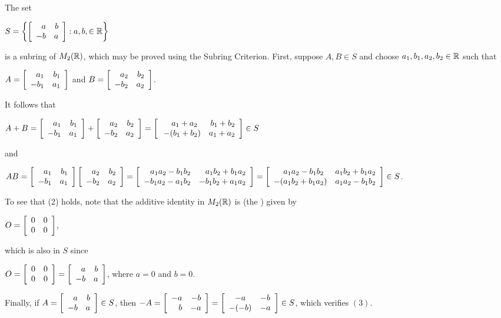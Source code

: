 \documentclass[11pt,fleqn,dvipsnames,usenames]{article}
\newcommand{\p}{\noindent}
\begin{document}
%
\begin{example}\label{abnegativebasubring}
The set
\begin{center}
$S = \SET{\MATRIX{rr}{a & b\\-b & a}:a,b,\in\REAL}$
\end{center}
is a subring of $M_{2}(\REAL)$, which may be proved using the Subring Criterion.  First, suppose $A,B\in S$ and choose $a_{1},b_{1},a_{2},b_{2}\in\REAL$ such that
\begin{center}
$A = \MATRIX{rr}{a_{1} & b_{1}\\-b_{1} & a_{1}}$ and $B = \MATRIX{rr}{a_{2} & b_{2}\\-b_{2} & a_{2}}$.
\end{center}
It follows that
\begin{center}
$A + B = \MATRIX{rr}{a_{1} & b_{1}\\-b_{1} & a_{1}} + \MATRIX{rr}{a_{2} & b_{2}\\-b_{2} & a_{2}} =  \MATRIX{rr}{\phantom{-(}a_{1} + a_{2}\phantom{)}& b_{1} + b_{2}\\-(b_{1} + b_{2}) & a_{1} + a_{2}}\in S$
\end{center}
and
\vsp

\begin{adjustwidth}{-100pt}{-100pt}
\begin{center}
$AB = \MATRIX{rr}{a_{1} & b_{1}\\-b_{1} & a_{1}}\MATRIX{rr}{a_{2} & b_{2}\\-b_{2} & a_{2}} = \MATRIX{cc}{\phantom{-}a_1a_2 - b_1b_2 & \phantom{-}a_1b_2 + b_1a_2\\-b_1a_2-a_1b_2 & -b_1b_2 + a_1a_2} = \MATRIX{cc}{\phantom{-(}a_1a_2 - b_1b_2\phantom{)} & a_1b_2 + b_1a_2\\-(a_1b_2 + b_1a_2) & a_1a_2 - b_1b_2}\in S$.
\end{center}
\end{adjustwidth}
\vsp

\p To see that (2) holds, note that the additive identity in $M_2(\REAL)$ is (the ) given by
\begin{center}
$O = \MATRIX{rr}{0 & 0\\0 & 0}$,
\end{center}
which is also in $S$ since
\begin{center}
$O = \MATRIX{rr}{0 & 0\\0 & 0} = \MATRIX{rr}{a & b\\-b & a}$, where $a = 0$ and $b = 0$.
\end{center}
\p Finally, if $A = \MATRIX{rr}{a & b\\-b & a}\in S$, then $-A = \MATRIX{rr}{-a & -b\\b & -a} = \MATRIX{cc}{-a & -b\\-(-b) & -a}\in S$, which verifies $(3)$.
\end{example}
\end{document}
